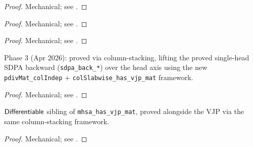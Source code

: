 \begin{proof}
\leanok
Mechanical; see .
\end{proof}

\begin{theorem}
  \label{thm:sdpa_back_K_correct}
  \leanok
\end{theorem}

\begin{proof}
\leanok
Mechanical; see .
\end{proof}

\begin{theorem}
  \label{thm:sdpa_back_V_correct}
  \leanok
\end{theorem}

\begin{proof}
\leanok
Mechanical; see .
\end{proof}

\begin{theorem}
  \label{ax:mhsa_has_vjp_mat}
  \leanok
  Phase 3 (Apr 2026): proved via column-stacking, lifting the
  proved single-head SDPA backward (\texttt{sdpa\_back\_*}) over
  the head axis using the new \texttt{pdivMat\_colIndep} +
  \texttt{colSlabwise\_has\_vjp\_mat} framework.
\end{theorem}

\begin{proof}
\leanok
Mechanical; see .
\end{proof}

\begin{theorem}
  \label{ax:mhsa_layer_flat_diff}
  \leanok
  \(\mathsf{Differentiable}\) sibling of \texttt{mhsa\_has\_vjp\_mat},
  proved alongside the VJP via the same column-stacking framework.
\end{theorem}

\begin{proof}
\leanok
Mechanical; see .
\end{proof}

